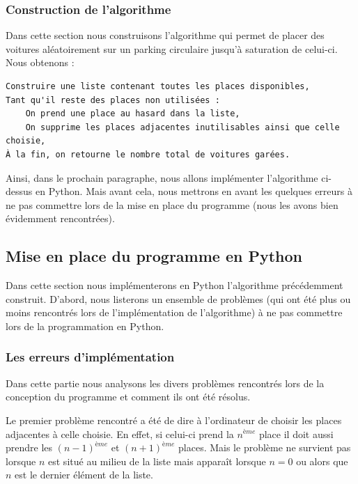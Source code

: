 \documentclass[a4paper,francais,11pt]{article}
\begin{document}
\subsubsection{Construction de l'algorithme}
Dans cette section nous construisons l'algorithme qui permet de placer des voitures aléatoirement sur un parking circulaire jusqu'à saturation de celui-ci. Nous obtenons :
\begin{center}
\begin{verbatim}
Construire une liste contenant toutes les places disponibles,
Tant qu'il reste des places non utilisées :
    On prend une place au hasard dans la liste,
    On supprime les places adjacentes inutilisables ainsi que celle choisie,
À la fin, on retourne le nombre total de voitures garées.
\end{verbatim}
\end{center}

Ainsi, dans le prochain paragraphe, nous allons implémenter l'algorithme ci-dessus en Python. Mais avant cela, nous mettrons en avant les quelques erreurs à ne pas commettre lors de la mise en place du programme (nous les avons bien évidemment rencontrées).
\subsection{Mise en place du programme en Python}
Dans cette section nous implémenterons en Python l'algorithme précédemment construit. D'abord, nous listerons un ensemble de problèmes (qui ont été plus ou moins rencontrés lors de l'implémentation de l'algorithme) à ne pas commettre lors de la programmation en Python.
\subsubsection{Les erreurs d'implémentation}
Dans cette partie nous analysons les divers problèmes rencontrés lors de la conception du programme et comment ils ont été résolus.

Le premier problème rencontré a été de dire à l'ordinateur de choisir les places adjacentes à celle choisie. En effet, si celui-ci prend la $n^{ème}$ place il doit aussi prendre les $\left(n-1\right)^{ème}$ et $\left(n+1\right)^{ème}$ places. Mais le problème ne survient pas lorsque $n$ est situé au milieu de la liste mais apparaît lorsque $n=0$ ou alors que $n$ est le dernier élément de la liste.
\end{document}
